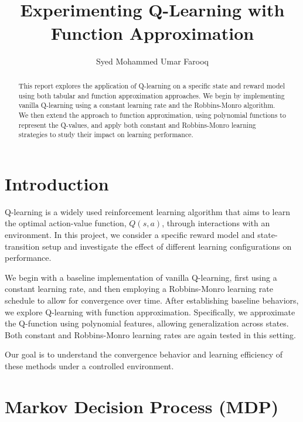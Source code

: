 \documentclass[10pt,twocolumn,letterpaper]{article}
\title{
		\usefont{OT1}{bch}{b}{n}\\ 
		\huge Experimenting Q-Learning with Function Approximation \\
}
\author{Syed Mohammed Umar Farooq}
\affil{\small{Department of Electrical Engineering, IIT Madras}}
\begin{document}
\date{} 
\maketitle

\begin{abstract}
This report explores the application of Q-learning on a specific state and reward model using both tabular and function approximation approaches. We begin by implementing vanilla Q-learning using a constant learning rate and the Robbins-Monro algorithm. We then extend the approach to function approximation, using polynomial functions to represent the Q-values, and apply both constant and Robbins-Monro learning strategies to study their impact on learning performance.

\end{abstract} 
\vspace{-5pt}

\section{Introduction}
Q-learning is a widely used reinforcement learning algorithm that aims to learn the optimal action-value function, $Q(s, a)$, through interactions with an environment. In this project, we consider a specific reward model and state-transition setup and investigate the effect of different learning configurations on performance.
\vspace{2mm}

We begin with a baseline implementation of vanilla Q-learning, first using a constant learning rate, and then employing a Robbins-Monro learning rate schedule to allow for convergence over time. After establishing baseline behaviors, we explore Q-learning with function approximation. Specifically, we approximate the Q-function using polynomial features, allowing generalization across states. Both constant and Robbins-Monro learning rates are again tested in this setting.
\vspace{2mm}

Our goal is to understand the convergence behavior and learning efficiency of these methods under a controlled environment.


\section{Markov Decision Process (MDP)}
\end{document}
